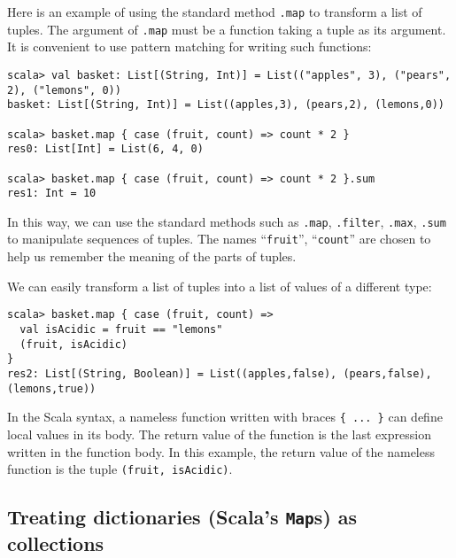 Here is an example of using the standard method \lstinline!.map!
to transform a list of tuples. The argument of \lstinline!.map!
must be a function taking a tuple as its argument. It is convenient
to use pattern matching for writing such functions:
\begin{lstlisting}
scala> val basket: List[(String, Int)] = List(("apples", 3), ("pears", 2), ("lemons", 0))
basket: List[(String, Int)] = List((apples,3), (pears,2), (lemons,0))

scala> basket.map { case (fruit, count) => count * 2 }
res0: List[Int] = List(6, 4, 0)

scala> basket.map { case (fruit, count) => count * 2 }.sum
res1: Int = 10
\end{lstlisting}
In this way, we can use the standard methods such as \lstinline!.map!,
\lstinline!.filter!, \lstinline!.max!,
\lstinline!.sum! to manipulate
sequences of tuples. The names ``\lstinline!fruit!'',
``\lstinline!count!''
are chosen to help us remember the meaning of the parts of tuples.

We can easily transform a list of tuples into a list of values of
a different type:
\begin{lstlisting}
scala> basket.map { case (fruit, count) =>
  val isAcidic = fruit == "lemons"
  (fruit, isAcidic)
}
res2: List[(String, Boolean)] = List((apples,false), (pears,false), (lemons,true)) 
\end{lstlisting}
In the Scala syntax, a nameless function written with braces \lstinline!{ ... }!
can define local values in its body. The return value of the function
is the last expression written in the function body. In this example,
the return value of the nameless function is the tuple \lstinline!(fruit, isAcidic)!.

\subsection{Treating dictionaries (Scala's \texttt{Map}s) as collections}

